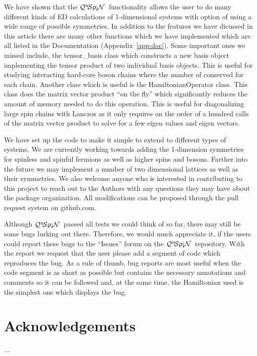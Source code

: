 \documentclass{SciPost}
\newcommand\0{\scalebox{-1}[1]{0}}
\newcommand{\qspin}{$\mathcal{Q}^{\mathrm{u}}\!\mathcal{S}\uprho\mathrm{\text{\textexclamdown}}\mathcal{N}$}
\begin{document}
We have shown that the \qspin\ functionality allows the user to do many different kinds of ED calculations of 1-dimensional systems with option of using a wide range of possible symmetries. In addition to the features we have dicussed in this article there are many other functions which we have implemented which are all listed in the Documentation (Appendix~\ref{app:doc}). Some important ones we missed include, the tensor\_basis class which constructs a new basis object implementing the tensor product of two individual basis objects. This is useful for studying interacting hard-core boson chains where the number of conserved for each chain. Another class which is useful is the HamiltonianOperator class. This class does the matrix vector product ``on the fly'' which significantly reduces the amount of memory needed to do this operation. This is useful for diagonalizing large spin chains with Lanczos as it only requires on the order of a hundred calls of the matrix vector product to solve for a few eigen values and eigen vectors. 

We have set up the code to make it simple to extend to different types of systems. We are currently working towards adding the 1-dimension symmetries for spinless and spinful fermions as well as higher spins and bosons. Farther into the future we may implement a number of two dimensional lattices as well as their symmetries. We also welcome anyone who is interested in contributing to this project to reach out to the Authors with any questions they may have about the package organization. All modifications can be proposed through the pull request system on github.com.  

Although \qspin\ passed all tests we could think of so far, there may still be some bugs lurking out there. Therefore, we would much appreciate it, if the users could report these bugs to the ``Issues'' forum on the \qspin\ repository. With the report we request that the user please add a segment of code which reproduces the bug. As a rule of thumb, bug reports are most useful when the code segment is as short as possible but contains the necessary annotations and comments so it can be followed and, at the same time, the Hamiltonian used is the simplest one which displays the bug.


\section*{Acknowledgements}
...

\end{document}
